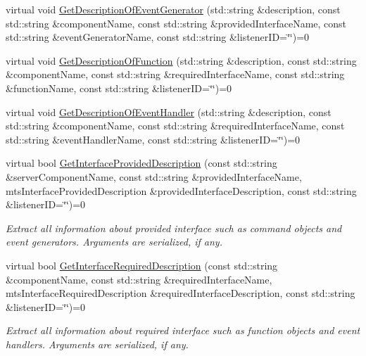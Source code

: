 \begin{DoxyCompactItemize}
\item 
virtual void \hyperlink{classmts_manager_local_interface_a96d45da8fb3ece61b6c99504c74df114}{Get\+Description\+Of\+Event\+Generator} (std\+::string \&description, const std\+::string \&component\+Name, const std\+::string \&provided\+Interface\+Name, const std\+::string \&event\+Generator\+Name, const std\+::string \&listener\+I\+D=\char`\"{}\char`\"{})=0
\item 
virtual void \hyperlink{classmts_manager_local_interface_a70d67480d63eafe650906d87a255f612}{Get\+Description\+Of\+Function} (std\+::string \&description, const std\+::string \&component\+Name, const std\+::string \&required\+Interface\+Name, const std\+::string \&function\+Name, const std\+::string \&listener\+I\+D=\char`\"{}\char`\"{})=0
\item 
virtual void \hyperlink{classmts_manager_local_interface_acf03d1240b5f0ba5637cd32fdd03ecaa}{Get\+Description\+Of\+Event\+Handler} (std\+::string \&description, const std\+::string \&component\+Name, const std\+::string \&required\+Interface\+Name, const std\+::string \&event\+Handler\+Name, const std\+::string \&listener\+I\+D=\char`\"{}\char`\"{})=0
\item 
virtual bool \hyperlink{classmts_manager_local_interface_a2a3db8231dd1d120d07352f90c55abd9}{Get\+Interface\+Provided\+Description} (const std\+::string \&server\+Component\+Name, const std\+::string \&provided\+Interface\+Name, mts\+Interface\+Provided\+Description \&provided\+Interface\+Description, const std\+::string \&listener\+I\+D=\char`\"{}\char`\"{})=0
\begin{DoxyCompactList}\small\item\em Extract all information about provided interface such as command objects and event generators. Arguments are serialized, if any. \end{DoxyCompactList}\item 
virtual bool \hyperlink{classmts_manager_local_interface_a3010191948ef1402d231eb94af75b51b}{Get\+Interface\+Required\+Description} (const std\+::string \&component\+Name, const std\+::string \&required\+Interface\+Name, mts\+Interface\+Required\+Description \&required\+Interface\+Description, const std\+::string \&listener\+I\+D=\char`\"{}\char`\"{})=0
\begin{DoxyCompactList}\small\item\em Extract all information about required interface such as function objects and event handlers. Arguments are serialized, if any. \end{DoxyCompactList}\end{DoxyCompactItemize}


